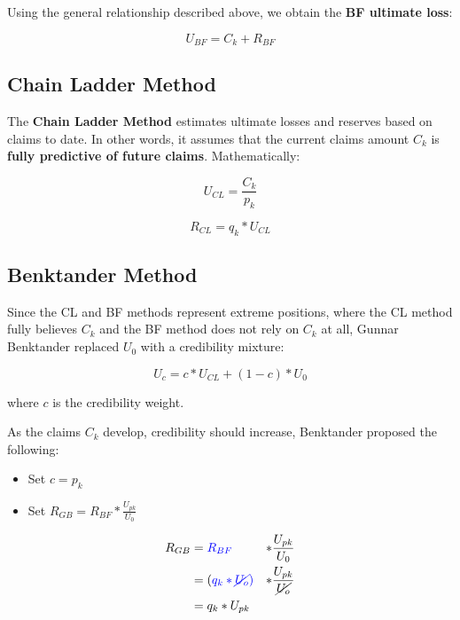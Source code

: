 \documentclass{article}
\begin{document}
\bigskip

Using the general relationship described above, we obtain the \textbf{BF
ultimate loss}:

\begin{equation}
U_{BF} = C_k + R_{BF}
\end{equation}

\subsection{Chain Ladder Method }

The \textbf{Chain Ladder Method} estimates ultimate losses and reserves based
on claims to date. In other words, it assumes that the current claims amount
$C_k$ is \textbf{fully predictive of future claims}. Mathematically:

\begin{equation}
U_{CL} = \frac{C_k}{p_k}
\end{equation}

\begin{equation}
R_{CL} = q_k * U_{CL}
\end{equation}

\subsection{Benktander Method }

Since the CL and BF methods represent extreme positions, where the CL method
fully believes $C_k$ and the BF method does not rely on $C_k$ at all, Gunnar
Benktander replaced $U_0$ with a credibility mixture:

\begin{equation}
U_c = c * U_{CL} + (1 - c) * U_0
\end{equation}

where $c$ is the credibility weight.

\bigskip

As the claims $C_k$ develop, credibility should increase, Benktander proposed 
the following:

\begin{itemize}
    \item Set $c = p_k$
    \item Set $R_{GB} = R_{BF} * \frac{U_{pk}}{U_0}$
\end{itemize}

\begin{equation}
    \begin{aligned}
    R_{GB} &= \color{blue}{R_{BF}} &* \color{black}\frac{U_{pk}}{U_0} \\
    &= (\color{blue}{q_k * \cancel{U_o}}) &* 
        \color{black}\frac{U_{pk}}{\cancel{U_o}} \\
    &= q_k * U_{pk}
    \end{aligned}
\end{equation}
\end{document}
